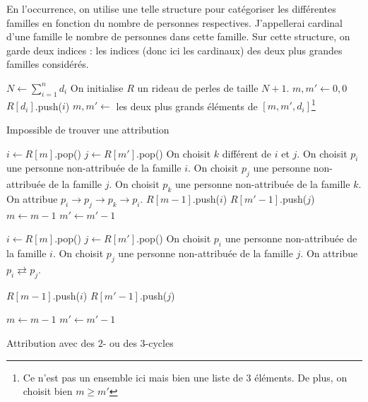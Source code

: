 \documentclass{../../notes}
\begin{document}
  En l'occurrence, on utilise une telle structure pour catégoriser les différentes familles en fonction du nombre de personnes respectives. J'appellerai cardinal d'une famille le nombre de personnes dans cette famille.
  Sur cette structure, on garde deux indices : les indices (donc ici les cardinaux) des deux plus grandes familles considérés.

  \begin{algorithm}[H]
    \centering
    \begin{algorithmic}[1]
      \Statex {}
      \State $N \gets \sum_{i = 1}^n d_i$
      \State On initialise $R$ un rideau de perles de taille $N + 1$.
      \State $m, m' \gets 0, 0$
      \State $R[d_i]$.push($i$)
      \State $m, m' \gets$ les deux plus grands éléments de  $[m, m', d_i]$\footnote{Ce n'est pas un ensemble ici mais bien une liste de $3$ éléments. De plus, on choisit bien $m \ge m'$}
      \EndFor

      \vspace{0.5em}
      \Statex {}

      \State \Return Impossible de trouver une attribution \label{algo:2-3-line-check}
      \EndIf

      \vspace{0.5em}
      \Statex {}

      \State $i \gets R[m]$.pop()
      \State $j \gets R[m']$.pop()
      \State On choisit $k$ différent de $i$ et $j$. 
      \State On choisit $p_i$ une personne non-attribuée de la famille $i$.
      \State On choisit $p_j$ une personne non-attribuée de la famille $j$.
      \State On choisit $p_k$ une personne non-attribuée de la famille $k$.
      \State On attribue $p_i \to p_j \to p_k \to p_i$.
      \State $R[m - 1]$.push($i$)
      \State $R[m' - 1]$.push($j$) \label{algo:2-3-odd}
       $m \gets m - 1$ \EndIf
       $m' \gets m' - 1$ \EndIf
      \EndIf

      \vspace{0.5em}
      \Statex {}

       \label{algo:2-3-while-loop}
      \State $i \gets R[m]$.pop()
      \State $j \gets R[m']$.pop()
      \State On choisit $p_i$ une personne non-attribuée de la famille $i$.
      \State On choisit $p_j$ une personne non-attribuée de la famille $j$.
      \State On attribue $p_i \rightleftarrows p_j$.

      \State $R[m - 1]$.push($i$)
      \State $R[m' - 1]$.push($j$)

       $m \gets m - 1$ \EndIf
       $m' \gets m' - 1$ \EndIf
      \EndWhile
    \end{algorithmic}
    \caption{Attribution avec des $2$- ou des $3$-cycles}
    \label{algo:2-3}
  \end{algorithm}
  \showfootnote
\end{document}
